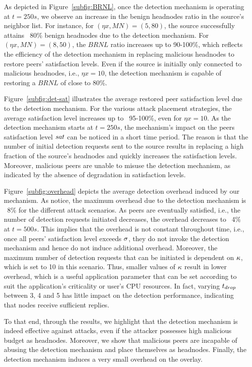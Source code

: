 As depicted in Figure~\ref{subfig:BRNL}, once the detection mechanism is operating at $t=250s$, we observe an increase in the benign headnodes ratio in the source's neighbor list.
For instance, for $(\eta x, MN)=(5, 80)$, the source successfully attains ~80\% benign headnodes due to the detection mechanism.
For $(\eta x, MN)=(8, 50)$, the $BRNL$ ratio increases up to 90-100\%, which reflects the efficiency of the detection mechanism in replacing malicious headnodes to restore peers' satisfaction levels. 
Even if the source is initially only connected to malicious headnodes, i.e., $\eta x=10$, the detection mechanism is capable of restoring a $BRNL$ of close to 80\%. 

Figure~\ref{subfig:det-sat} illustrates the average restored peer satisfaction level due to the detection mechanism.
For the various attack placement strategies, the average satisfaction level increases up to ~95-100\%, even for $\eta x=10$.
As the detection mechanism starts at $t=250s$, the mechanism's impact on the peers satisfaction level $sat$ can be noticed in a short time period.
The reason is that the number of initial detection requests sent to the source results in replacing a high fraction of the source's headnodes and quickly increases the satisfaction levels. 
Moreover, malicious peers are unable to misuse the detection mechanism, as indicated by the absence of degradation in  satisfaction levels. 

Figure~\ref{subfig:overhead} depicts the average detection overhead induced by our mechanism. 
As notice, the maximum overhead due to the detection mechanism is ~8\% for the different attack scenarios.
As peers are eventually satisfied, i.e., the number of detection requests initiated decreases, the overhead decreases to ~4\% at $t=500s$.
This implies that the overhead is not constant throughout time, i.e., once all peers' satisfaction level exceeds $\sigma$, they do not invoke the detection mechanism and hence do not induce additional overhead. 
Moreover, the maximum number of detection requests that can be initiated is dependent on $\kappa$, which is set to 10 in this scenario.
Thus, smaller values of $\kappa$ result in lower overhead, which is a useful application parameter that can be set according to suit the application's criticality or user's CPU resources.
In fact, varying $t_{drop}$ between 3, 4 and 5 has little impact on the detection performance, indicating that nodes receive sufficient replies.

To that end, through the results, we highlight that the detection mechanism is indeed effective against \drop attacks, even if the attacker possesses high malicious budget as headnodes.
Moreover, we show that malicious peers are incapable of abusing the detection mechanism and place themselves as headnodes. Finally, the detection mechanism induces a very small overhead on the overlay.



